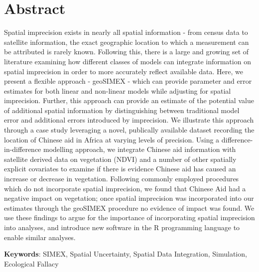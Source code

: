 \section{Abstract}
Spatial imprecision exists in nearly all spatial information - from census data to satellite information, the exact geographic location to which a measurement can be attributed is rarely known.
Following this, there is a large and growing set of literature examining how different classes of models can integrate information on spatial imprecision in order to more accurately reflect available data.
Here, we present a flexible approach - geoSIMEX - which can provide parameter and error estimates for both linear and non-linear models while adjusting for spatial imprecision.
Further, this approach can provide an estimate of the potential value of additional spatial information by distinguishing between traditional model error and additional errors introduced by imprecision.
We illustrate this approach through a case study leveraging a novel, publically available dataset recording the location of Chinese aid in Africa at varying levels of precision.
Using a difference-in-difference modelling approach, we integrate Chinese aid information with satellite derived data on vegetation (NDVI) and a number of other spatially explicit covariates to examine if there is evidence Chinese aid has caused an increase or decrease in vegetation.
Following commonly employed procedures which do not incorporate spatial imprecision, we found that Chinese Aid had a negative impact on vegetation; once spatial imprecision was incorporated into our estimates through the geoSIMEX procedure no evidence of impact was found.
We use these findings to argue for the importance of incorporating spatial imprecision into analyses, and introduce new software in the R programming language to enable similar analyses.

\textbf{Keywords}: SIMEX, Spatial Uncertainty, Spatial Data Integration, Simulation, Ecological Fallacy\\
\newpage

